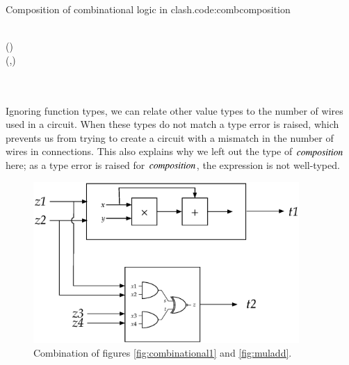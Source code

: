 \begin{texexptitled}{Composition of combinational logic in \gls{clash}.}{code:combcomposition}\begin{hscode}\SaveRestoreHook
{}%
%
%
%
\>[B]{}\mathbin{::}\to {}\to {}\<[E]%
\\
\>[B]{}\;\;\mathrel{=}(\mathbin{*})\mathbin{+}\<[E]%
\\[\blanklineskip]%
\>[B]{}\;\;\;\;\mathrel{=}(,){}\<[E]%
\\
\>[B]{}\<[4]%
\>[4]{}\<[E]%
\\
\>[4]{}\<[6]%
\>[6]{}\mathrel{=}\;\;\<[E]%
\\
\>[4]{}\<[6]%
\>[6]{}\mathrel{=}\;\;\;\;\<[E]%
\ColumnHook
\end{hscode}\resethooks
\end{texexptitled}

Ignoring function types, we can relate other value types to the number of wires used in a circuit.
When these types do not match a type error is raised, which prevents us from trying to create a circuit with a mismatch in the number of wires in connections.
This also explains why we left out the type of \ensuremath{\Varid{composition}} here; as a type error is raised for \ensuremath{\Varid{composition}}, the expression is not well-typed. 

\begin{figure}[H]
\begin{center}
\centering
\includegraphics[width=0.9\textwidth]{images/muladdcomblogic}
\end{center}
\caption{Combination of figures \ref{fig:combinational1} and \ref{fig:muladd}.} \label{fig:combinational3}
\end{figure}


